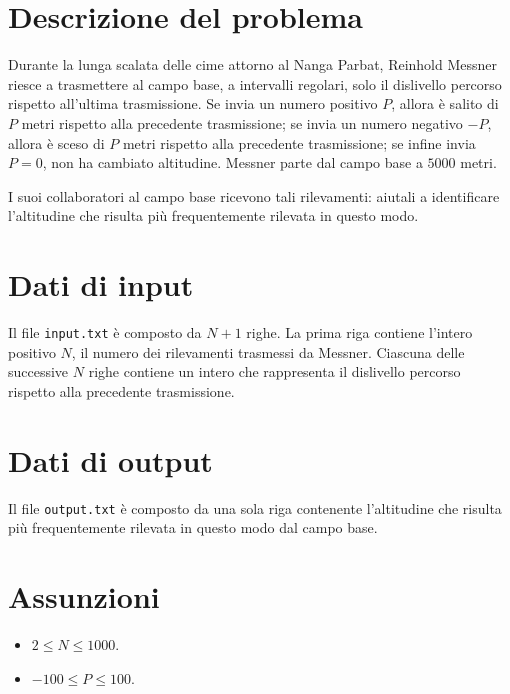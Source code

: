 \documentclass[a4paper,11pt]{article}
\begin{document}
\vspace{0.5cm}



\vspace{0.5cm}

\section*{Descrizione del problema}
   
Durante la lunga scalata delle cime attorno al Nanga Parbat,
Reinhold Messner riesce a trasmettere al campo base, a intervalli
regolari, solo il dislivello percorso rispetto all'ultima
trasmissione. Se invia un numero positivo $P$, allora
è salito di $P$ metri rispetto alla precedente
trasmissione; se invia un numero negativo
$-P$, allora è sceso di $P$ metri rispetto
alla precedente trasmissione; se infine invia $P=0$, non ha cambiato
altitudine. Messner parte dal campo base a $5000$ metri.

I suoi collaboratori al campo base ricevono tali rilevamenti: aiutali
a identificare l'altitudine che risulta più frequentemente
rilevata in questo modo.


\section*{Dati di input}
  
Il file \texttt{input.txt} è composto da $N+1$
righe.  La prima riga contiene l'intero positivo $N$, il
numero dei rilevamenti trasmessi da Messner. Ciascuna delle successive
$N$ righe contiene un intero che rappresenta il dislivello
percorso rispetto alla precedente trasmissione. 


\section*{Dati di output}
  
Il file \texttt{output.txt} è composto da una sola riga
contenente l'altitudine che risulta più frequentemente
rilevata in questo modo dal campo base.

\section*{Assunzioni}

\begin{itemize}
  \item  $2 ≤ N ≤ 1000$.
  \item  $-100 ≤ P ≤ 100$.
\end{itemize}
\end{document}

